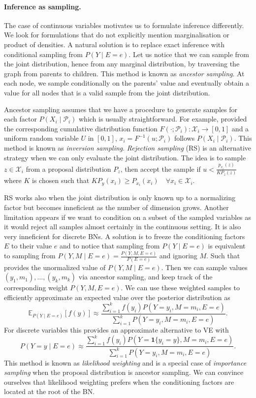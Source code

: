 \paragraph{Inference as sampling.}
The case of continuous variables motivates us to formulate inference differently. We look for formulations that do not explicitly mention marginalisation or product of densities. A natural solution is to replace exact inference with conditional sampling from $P(Y\mid E=e)$. Let us notice that we can sample from the joint distribution, hence from any marginal distribution, by traversing the graph from parents to children. This method is known as \textit{ancestor sampling}. At each node, we sample conditionally on the parents' value and eventually obtain a value for all nodes that is a valid sample from the joint distribution.

Ancestor sampling assumes that we have a procedure to generate samples for each factor $P(X_i\mid \mathcal{P}_i)$ which is usually straightforward. For example, provided the corresponding cumulative distribution function $F(\cdot;\mathcal{P}_i): \mathcal{X}_i \rightarrow \left[0, 1 \right]$ and a uniform random variable $U$ in $\left[0, 1\right]$, $x_i=F^{-1}(u;\mathcal{P}_i)$ follows $P(X_i\mid \mathcal{P}_i)$. This method is known as \textit{inversion sampling}. \textit{Rejection sampling} (RS) is an alternative strategy when we can only evaluate the joint distribution. The idea is to sample $z \in \mathcal{X}_i$ from a proposal distribution $P_z$, then accept the sample if $u< \frac{p_{x_i}(z)}{K P_z(z)} $ where $K$ is chosen such that $ K P_y(x_i) \geq P_{x_i}(x_i) \quad \forall x_i \in \mathcal{X}_i$.

RS works also when the joint distribution is only known up to a normalizing factor but becomes inneficient as the number of dimension grows. Another limitation appears if we want to condition on a subset of the sampled variables as it would reject all samples almost certainly in the continuous setting. It is also very inneficient for discrete BNs. A solution is to freeze the conditioning factors $E$ to their value $e$ and to notice that sampling from $P(Y\mid E=e)$ is equivalent to sampling from $P(Y, M\mid E=e) = \frac{P(Y, M, E=e)}{P(E=e)}$ and ignoring $M$. Such that  provides the unormalized value of $P(Y, M\mid E=e)$. Then we can sample values $(y_1, m_1), \dots, (y_k, m_k)$ via ancestor sampling, and keep track of the corresponding weight $P(Y, M, E=e)$. We can use these weighted samples to efficiently approximate an expected value over the posterior distribution as
$$ \mathbb{E}_{P(Y\mid E=e)}\left[f(y)\right] \approx \frac{\sum_{i=1}^k f(y_i) P(Y=y_i, M=m_i, E=e)}{\sum_{i=1}^k P(Y=y_i, M=m_i, E=e) }.$$ For discrete variables this provides an approximate alternative to VE with $$P(Y=y\mid E=e) \approx \frac{\sum_{i=1}^k f(y_i) P(Y=\bm{1}\{y_i = y\}, M=m_i, E=e)}{\sum_{i=1}^k P(Y=y_i, M=m_i, E=e)}. $$ This method is known as \textit{likelihood weighting} and is a special case of \textit{importance sampling} when the proposal distribution is ancestor sampling. We can convince ourselves that likelihood weighting prefers when the conditioning factors are located at the root of the BN.

